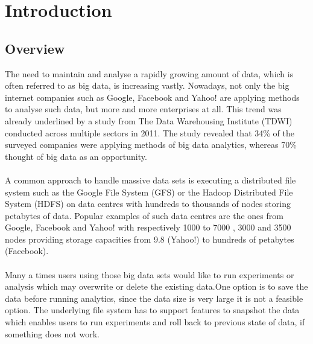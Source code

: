 
%
%
%


\chapter{Introduction}
\label{ch:Introduction}

\section{Overview}
The need to maintain and analyse a rapidly growing amount of data, which is often referred to as big data, is increasing vastly. Nowadays, not only the big internet companies such as Google, Facebook and Yahoo! are applying methods to analyse such data, but more and more enterprises at all. This trend was already underlined by a study from The Data Warehousing Institute (TDWI)  conducted across multiple sectors in 2011. The study \cite{TWDI-Report} revealed that 34\% of the surveyed companies were applying methods of big data analytics, whereas 70\% thought of big data as an opportunity. \\\\
  A common approach to handle massive data sets is executing a distributed file system such as the Google File System (GFS)  or the Hadoop Distributed File System (HDFS)  on data centres with hundreds to thousands of nodes storing petabytes of data. Popular examples of such data centres are the ones from Google, Facebook and Yahoo! with respectively 1000 to 7000 , 3000  and 3500 nodes  providing storage capacities from 9.8 (Yahoo!) to hundreds of petabytes (Facebook).\\\\
Many a times users using those big data sets would like to run experiments or analysis which may overwrite or delete the existing data.One option is to save the data before running analytics, since the data size is very large it is not a feasible option. The underlying file system has to support features to snapshot the data which enables users to run experiments and roll back to previous state of data, if something does not work.\\\\
